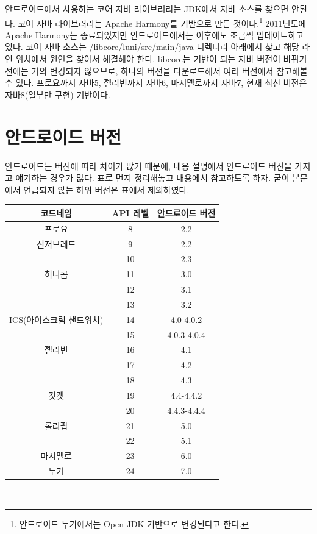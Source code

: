 안드로이드에서 사용하는 코어 자바 라이브러리는 JDK에서 자바 소스를 찾으면 안된다. 
코어 자바 라이브러리는 Apache Harmony를 기반으로 만든 것이다.\footnote{안드로이드 누가에서는 Open JDK 기반으로 변경된다고 한다.} 
2011년도에 Apache Harmony는 종료되었지만 안드로이드에서는 이후에도 조금씩 업데이트하고 있다. 
코어 자바 소스는 /libcore/luni/src/main/java 디렉터리 아래에서 찾고 해당 라인 위치에서 원인을 찾아서 해결해야 한다.  
libcore는 기반이 되는 자바 버전이 바뀌기 전에는 거의 변경되지 않으므로, 하나의 버전을 다운로드해서 여러 버전에서 참고해볼 수 있다. 
프로요까지 자바5, 젤리빈까지 자바6, 마시멜로까지 자바7, 현재 최신 버전은 자바8(일부만 구현) 기반이다.

\section{안드로이드 버전}
안드로이드는 버전에 따라 차이가 많기 때문에, 내용 설명에서 안드로이드 버전을 가지고 얘기하는 경우가 많다. 
표로 먼저 정리해놓고 내용에서 참고하도록 하자. 굳이 본문에서 언급되지 않는 하위 버전은 표에서 제외하였다.\\

\begin{tabular}{|c|c|c|}\hline
코드네임 & API 레벨 & 안드로이드 버전 \\ \hline
프로요 & 8 & 2.2 \\ \hline
진저브레드 & 9 & 2.2\\ \cline{2-3}
 & 10 & 2.3\\ \hline
허니콤 & 11 & 3.0\\ \cline{2-3}
 & 12 & 3.1\\ \cline{2-3}
 & 13 & 3.2\\ \hline
ICS(아이스크림 샌드위치) & 14 & 4.0-4.0.2\\ \cline{2-3}
 & 15 & 4.0.3-4.0.4\\ \hline 
젤리빈 & 16 & 4.1\\ \cline{2-3}
 & 17 & 4.2\\ \cline{2-3}
 & 18 & 4.3\\ \hline
킷캣 & 19 & 4.4-4.4.2\\ \cline{2-3}
 & 20 & 4.4.3-4.4.4\\ \hline  
롤리팝 & 21 & 5.0\\ \cline{2-3}
 & 22 & 5.1\\ \hline 
마시멜로 & 23 & 6.0\\ \hline 
누가 & 24 & 7.0\\ \hline 
\end{tabular}\\

